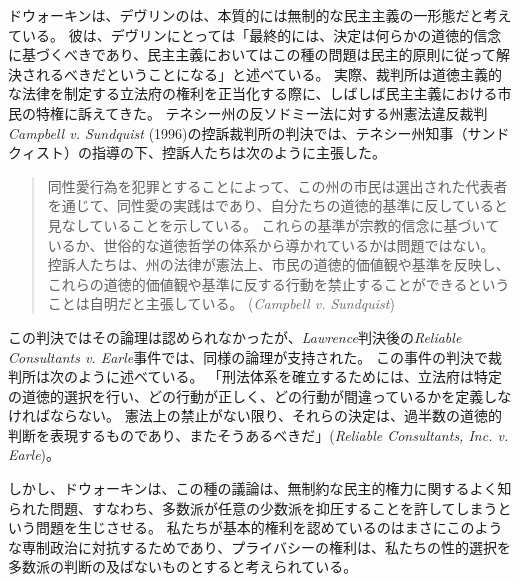 \documentclass[paper=a4,book,openany]{jlreq}
\newcommand{\ig}[1]{}           %
\begin{document}
ドウォーキン\ig{Ronald Dworkin}は、デヴリン\ig{Patrick Devlin}のは、本質的には無制的な民主主義の一形態だと考えている。
彼は、デヴリン\ig{Patrick Devlin}にとっては「最終的には、決定は何らかの道徳的信念に基づくべきであり、民主主義においてはこの種の問題は民主的原則に従って解決されるべきだということになる」と述べている\citep[pp.246--247]{dworkin77:_takin_right_serious}。
実際、裁判所は道徳主義的な法律を制定する立法府の権利を正当化する際に、しばしば民主主義における市民の特権に訴えてきた。
テネシー州の反ソドミー法に対する州憲法違反裁判 \emph{Campbell v. Sundquist} (1996)の控訴裁判所の判決では、テネシー州知事（サンドクィスト）の指導の下、控訴人たちは次のように主張した。

\begin{quote}
同性愛行為を犯罪とすることによって、この州の市民は選出された代表者を通じて、同性愛の実践はであり、自分たちの道徳的基準に反していると見なしていることを示している。
これらの基準が宗教的信念に基づいているか、世俗的な道徳哲学の体系から導かれているかは問題ではない。
控訴人たちは、州の法律が憲法上、市民の道徳的価値観や基準を反映し、これらの道徳的価値観や基準に反する行動を禁止することができるということは自明だと主張している。
(\emph{Campbell v. Sundquist}\ig{, 926 SW 2d 250, Tenn: Court of Appeals, Western Section 1996})
\end{quote}

この判決ではその論理は認められなかったが、\emph{Lawrence}判決後の\emph{Reliable Consultants v. Earle}事件では、同様の論理が支持された。
この事件の判決で裁判所は次のように述べている。
「刑法体系を確立するためには、立法府は特定の道徳的選択を行い、どの行動が正しく、どの行動が間違っているかを定義しなければならない。
憲法上の禁止がない限り、それらの決定は、過半数の道徳的判断を表現するものであり、またそうあるべきだ」(\emph{Reliable Consultants, Inc. v. Earle}\ig{, 517 F.3d 738, 2008})。

しかし、ドウォーキン\ig{Ronald Dworkin}は、この種の議論は、無制約な民主的権力に関するよく知られた問題、すなわち、多数派が任意の少数派を抑圧することを許してしまうという問題を生じさせる。
私たちが基本的権利を認めているのはまさにこのような専制政治に対抗するためであり、プライバシーの権利は、私たちの性的選択を多数派の判断の及ばないものとすると考えられている。
\end{document}
